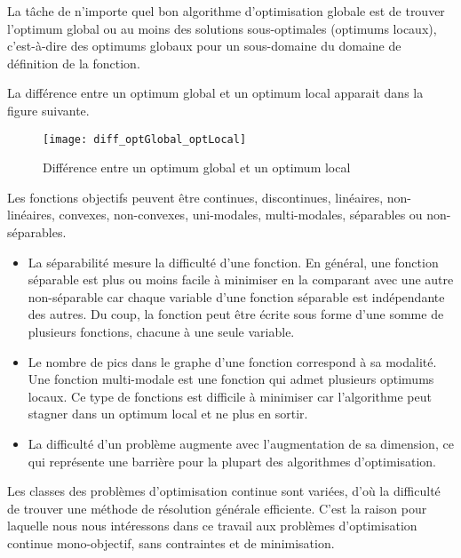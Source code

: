 \vspace{1em}

La tâche de n'importe quel bon algorithme d'optimisation globale
est de trouver l'optimum global ou au moins des solutions sous-optimales (optimums locaux), c'est-à-dire des optimums globaux pour un sous-domaine du domaine de définition de la fonction\cite{Momin_Yang_2013}.

\vspace{1em}

La différence entre un optimum global et un optimum local apparait dans la figure suivante.

\begin{figure}[H]
	\centering
	\texttt{[image: diff\_optGlobal\_optLocal]}
	\caption[Différence entre un optimum global et un optimum local]{Différence entre un optimum global et un optimum local \cite{boussaid}}
\end{figure}

Les fonctions objectifs peuvent être continues, discontinues,
linéaires, non-linéaires, convexes, non-convexes, uni-modales,
multi-modales, séparables ou non-séparables\cite{Momin_Yang_2013}.

\begin{itemize}
	\item La séparabilité mesure la difficulté d'une fonction. En général, une fonction séparable est plus ou moins facile à minimiser en la comparant avec une autre non-séparable car chaque variable d'une fonction séparable est indépendante des autres. Du coup, la fonction peut être écrite sous forme d'une somme de plusieurs fonctions, chacune à une seule variable\cite{Momin_Yang_2013}.
	\item Le nombre de pics dans le graphe d'une fonction correspond à sa modalité. Une fonction multi-modale est une fonction qui admet plusieurs optimums locaux. Ce type de fonctions est difficile à minimiser car l'algorithme peut stagner dans un optimum local et ne plus en sortir. 
	\item La difficulté d'un problème augmente avec l'augmentation de sa dimension, ce qui représente une barrière pour la plupart des algorithmes d'optimisation. 
\end{itemize}

Les classes des problèmes d'optimisation continue sont variées, d'où la difficulté de trouver une méthode de résolution générale efficiente. C'est la raison pour laquelle nous nous intéressons dans ce travail aux problèmes d'optimisation continue mono-objectif, sans contraintes et de minimisation.

